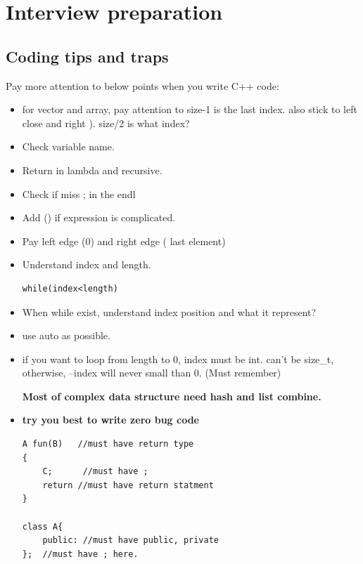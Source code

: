 \documentclass[a4paper,11pt,twoside]{book}
\begin{document}
	  
\chapter{Interview preparation}


\section{Coding tips and traps}
\par Pay more attention to below points when you write C++ code:
\begin{itemize}
	\item for vector and array, pay attention to size-1 is the last index. also stick to left close and right ).  size/2 is what index?  
	
	\item Check variable name. 
	
	\item Return in lambda and recursive. 
	
	\item  Check if miss ; in the endl
	
	\item Add () if expression is complicated. 
	\item Pay left edge (0) and right edge ( last element)
	\item Understand index and length. 
\begin{lstlisting}
while(index<length)
\end{lstlisting}	
	\item When while exist, understand index position and what it represent?
	\item use auto as possible.
	
	\item if you want to loop from length to 0, index must be int. can't be size\_t, otherwise, --index will never small than 0. (Must remember)
	
	\textbf{Most of complex data structure need hash and list combine.}
	
	\item \textbf{try you best to write zero bug code}
\begin{lstlisting}
A fun(B)   //must have return type
{
	C;      //must have ;
	return //must have return statment
}	

class A{
	public: //must have public, private
};  //must have ; here.	
\end{lstlisting}	
	
	
\end{itemize}
\end{document}
